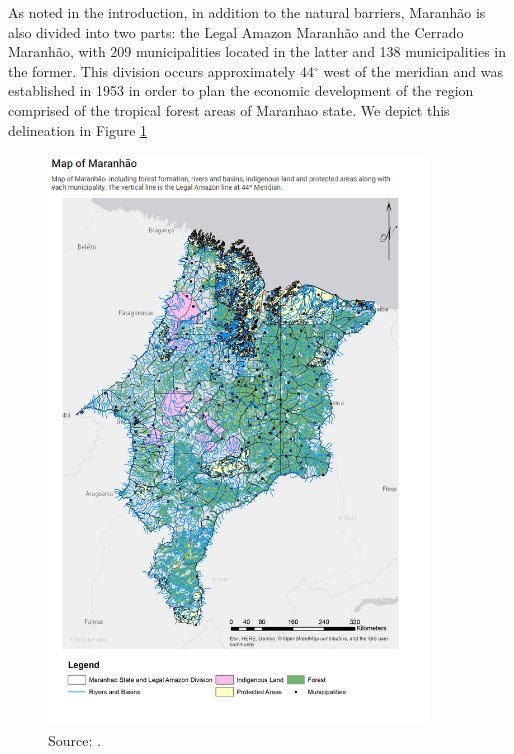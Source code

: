 As noted in the introduction, in addition to the natural barriers, Maranhão is also divided into two parts: the Legal Amazon Maranhão and the Cerrado Maranhão, with 209 municipalities located in the latter and 138 municipalities in the former. This division occurs approximately 44$^{\circ}$ west of the meridian and was established in 1953 in order to plan the economic development of the region comprised of the tropical forest areas of Maranhao state.  We depict this delineation in Figure \ref{fig:delimitacao}

\begin{figure}[H]
  \centering
  \includegraphics[width=0.9\textwidth, inner]{MaranhaoState2.png}
\caption{Source: \citep{MMMAwebsite,nugeo_2018,embrapa_2018}.}
\label{fig:delimitacao}
\end{figure}



